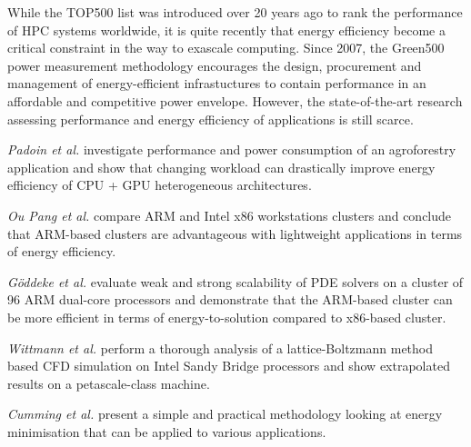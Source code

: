 While the  TOP500 list was  introduced over 20  years ago to  rank the
performance of HPC systems  worldwide, it is quite recently that energy
efficiency  become  a  critical  constraint  in the  way  to  exascale
computing.   Since 2007,  the Green500  power  measurement methodology
encourages the design,  procurement and management of energy-efficient
infrastuctures to contain performance in an affordable and competitive
power  envelope.   However,  the state-of-the-art  research  assessing
performance  and energy  efficiency  of applications  is still scarce.

\emph{Padoin et al.}   \citep{Padoin-2013} investigate performance and
power  consumption  of  an  agroforestry  application  and  show  that
changing workload  can drastically improve energy efficiency  of CPU +
GPU heterogeneous architectures.

\emph{Ou  Pang et  al.}   \citep{Ou-2012} compare  ARM  and Intel  x86
workstations  clusters  and   conclude  that  ARM-based  clusters  are
advantageous  with   lightweight  applications  in   terms  of  energy
efficiency.

\emph{G\"oddeke et al.}  \citep{Goddeke-2013} evaluate weak and strong
scalability of PDE solvers on a cluster of 96 ARM dual-core processors
and demonstrate  that the ARM-based  cluster can be more  efficient in
terms of energy-to-solution compared to x86-based cluster.

\emph{Wittmann  et  al.}   \citep{Wittmann-2013}  perform  a  thorough
analysis of  a lattice-Boltzmann method based CFD  simulation on Intel
Sandy Bridge  processors   and  show   extrapolated  results   on  a
petascale-class machine.

\emph{Cumming  et  al.}   \citep{Cumming-2014}  present a  simple  and
practical  methodology  looking at  energy  minimisation  that can  be
applied to various applications.
